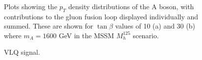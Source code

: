 \begin{figure}[!hbtp]
\centering
\caption{Plots showing the $p_{T}$ density distributions of the A boson, with contributions to the gluon fusion loop displayed individually and summed. These are shown for $\tan\beta$ values of 10 (a) and 30 (b) where $m_{A} = 1600 $ GeV in the MSSM $M_{h}^{125}$ scenario.}
\label{fig:mssm_sig}
\end{figure}


\begin{figure}[!hbtp]
\centering
\caption{VLQ signal.}
\label{fig:vlq_signal}
\end{figure}


